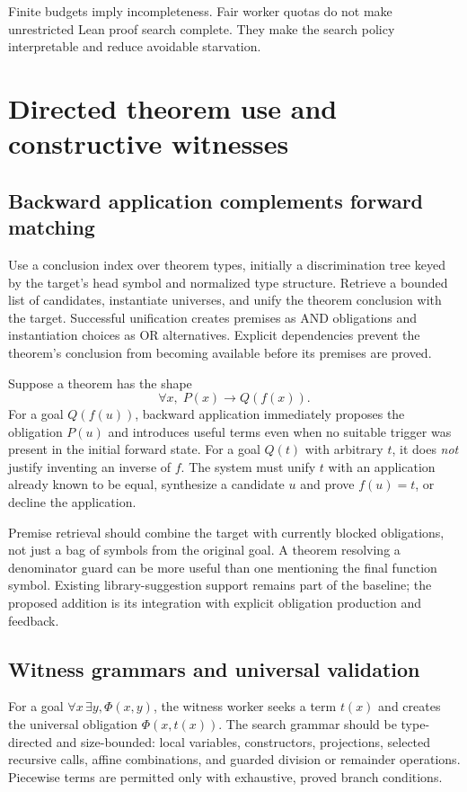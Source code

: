 \documentclass[11pt,a4paper]{article}
\theoremstyle{definition}
\begin{document}
Finite budgets imply incompleteness. Fair worker quotas do not make unrestricted Lean proof search complete. They make the search policy interpretable and reduce avoidable starvation.

\section{Directed theorem use and constructive witnesses}

\subsection{Backward application complements forward matching}

Use a conclusion index over theorem types, initially a discrimination tree keyed by the target's head symbol and normalized type structure. Retrieve a bounded list of candidates, instantiate universes, and unify the theorem conclusion with the target. Successful unification creates premises as AND obligations and instantiation choices as OR alternatives. Explicit dependencies prevent the theorem's conclusion from becoming available before its premises are proved.

Suppose a theorem has the shape
\[
  \forall x,\;P(x)\to Q(f(x)).
\]
For a goal $Q(f(u))$, backward application immediately proposes the obligation $P(u)$ and introduces useful terms even when no suitable trigger was present in the initial forward state. For a goal $Q(t)$ with arbitrary $t$, it does \emph{not} justify inventing an inverse of $f$. The system must unify $t$ with an application already known to be equal, synthesize a candidate $u$ and prove $f(u)=t$, or decline the application.

Premise retrieval should combine the target with currently blocked obligations, not just a bag of symbols from the original goal. A theorem resolving a denominator guard can be more useful than one mentioning the final function symbol. Existing library-suggestion support remains part of the baseline; the proposed addition is its integration with explicit obligation production and feedback.

\subsection{Witness grammars and universal validation}

For a goal $\forall x\,\exists y,\Phi(x,y)$, the witness worker seeks a term $t(x)$ and creates the universal obligation $\Phi(x,t(x))$. The search grammar should be type-directed and size-bounded: local variables, constructors, projections, selected recursive calls, affine combinations, and guarded division or remainder operations. Piecewise terms are permitted only with exhaustive, proved branch conditions.
\end{document}
